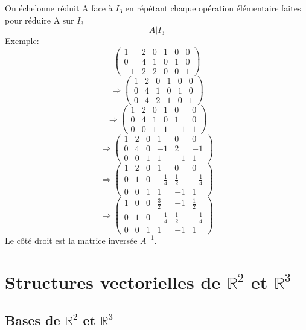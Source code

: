 \documentclass[10pt,a4paper]{book}
\newcommand{\R}{\mathbb{R}}
\begin{document}
On échelonne réduit A face à $I_3$ en répétant chaque opération élémentaire faites pour réduire A sur $I_3$
\[A | I_3 \]
Exemple:
\[\left(\begin{array}{ccc|ccc}
1 & 2 & 0 & 1 & 0 & 0 \\
0 & 4 & 1 & 0 & 1 & 0 \\
-1 & 2 & 2 & 0 & 0 & 1
\end{array}
\right)\]
\[\Rightarrow \left(\begin{array}{ccc|ccc}
1 & 2 & 0 & 1 & 0 & 0 \\
0 & 4 & 1 & 0 & 1 & 0 \\
0 & 4 & 2 & 1 & 0 & 1
\end{array}
\right)\]
\[\Rightarrow \left(\begin{array}{ccc|ccc}
1 & 2 & 0 & 1 & 0 & 0 \\
0 & 4 & 1 & 0 & 1 & 0 \\
0 & 0 & 1 & 1 & -1 & 1
\end{array}
\right)\]
\[\Rightarrow \left(\begin{array}{ccc|ccc}
1 & 2 & 0 & 1 & 0 & 0 \\
0 & 4 & 0 & -1 & 2 & -1 \\
0 & 0 & 1 & 1 & -1 & 1
\end{array}
\right)\]
\[\Rightarrow \left(\begin{array}{ccc|ccc}
1 & 2 & 0 & 1 & 0 & 0 \\
0 & 1 & 0 & -\frac{1}{4} & \frac{1}{2} & -\frac{1}{4} \\
0 & 0 & 1 & 1 & -1 & 1
\end{array}
\right)\]
\[\Rightarrow \left(\begin{array}{ccc|ccc}
1 & 0 & 0 & \frac{3}{2} & -1 & \frac{1}{2} \\
0 & 1 & 0 & -\frac{1}{4} & \frac{1}{2} & -\frac{1}{4} \\
0 & 0 & 1 & 1 & -1 & 1
\end{array}
\right)\]
Le côté droit est la matrice inversée $A^{-1}$.

\chapter{Structures vectorielles de \texorpdfstring{$\R^2$ et $\R^3$}{R2 et R3}}

\section{Bases de \texorpdfstring{$\R^2$ et $\R^3$}{R2 et R3}}
\end{document}
